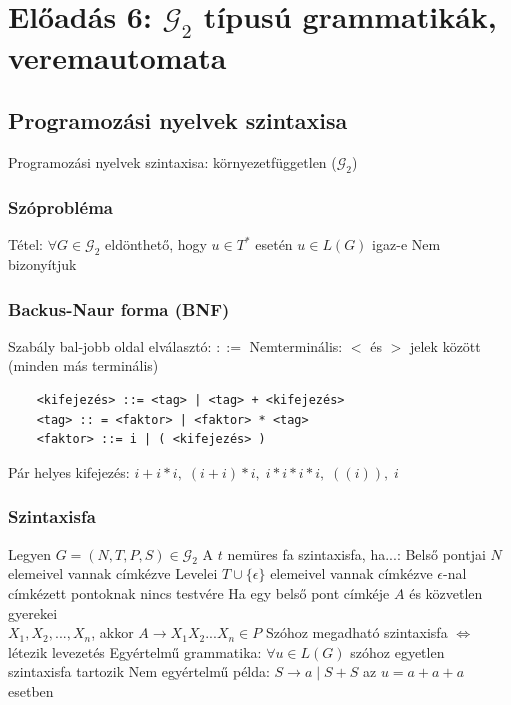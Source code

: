 \documentclass[12pt,a4paper]{article}
\begin{document}
\pagebreak

\section{Előadás 6: $\mathcal{G}_2$ típusú grammatikák, veremautomata}

\subsection{Programozási nyelvek szintaxisa}

\begin{outline}
	\1 Programozási nyelvek szintaxisa: környezetfüggetlen ($\mathcal{G}_2$)
\end{outline}

\subsubsection{Szóprobléma}

\begin{outline}
	\1 Tétel: $\forall G \in \mathcal{G}_2$ eldönthető, hogy $u \in T^*$ esetén $u \in L(G)$ igaz-e
		\2 Nem bizonyítjuk
\end{outline}

\subsubsection{Backus-Naur forma (BNF)}

\begin{outline}
	\1 Szabály bal-jobb oldal elválasztó: $::=$
	\1 Nemterminális: $<$ és $>$ jelek között (minden más terminális)
	\1 \begin{verbatim}
	<kifejezés> ::= <tag> | <tag> + <kifejezés>
	<tag> :: = <faktor> | <faktor> * <tag>
	<faktor> ::= i | ( <kifejezés> )
	\end{verbatim}
		\2 Pár helyes kifejezés: $i+i*i,\; (i+i)*i,\; i*i*i*i,\; ((i)),\; i$
\end{outline}

\subsubsection{Szintaxisfa}

\begin{outline}
	\1 Legyen $G = (N,T,P,S) \in \mathcal{G}_2$
	\1 A $t$ nemüres fa szintaxisfa, ha...:
		\2 Belső pontjai $N$ elemeivel vannak címkézve
		\2 Levelei $T \cup \{\epsilon\}$ elemeivel vannak címkézve
			\3 $\epsilon$-nal címkézett pontoknak nincs testvére
		\2 Ha egy belső pont címkéje $A$ és közvetlen gyerekei\\
		$X_1, X_2, ..., X_n$, akkor $A \to X_1X_2...X_n \in P$
	\1 Szóhoz megadható szintaxisfa $\Leftrightarrow$ létezik levezetés
	\1 Egyértelmű grammatika: $\forall u \in L(G)$ szóhoz egyetlen szintaxisfa tartozik
		\2 Nem egyértelmű példa: $S \to a \;|\; S + S$ az $u=a+a+a$ esetben
\end{outline}
\end{document}
